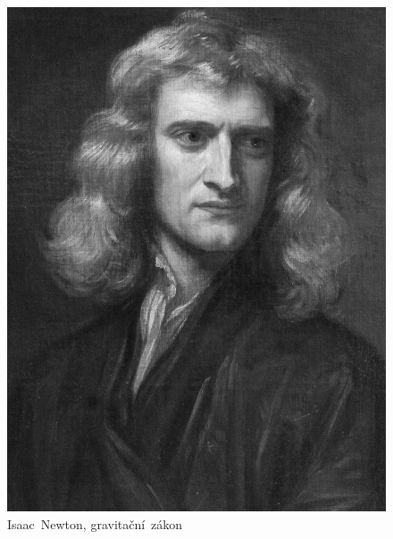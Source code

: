 \documentclass{../../../../style/mkimain}
\begin{document}
\begin{figure}[H]
\begin{center}
    \includegraphics[width=0.8\linewidth]{images/isaac-newton.jpg}
        Isaac~Newton, gravitační~zákon\\\ \\
    \end{center}
  \endminipage
\end{figure}
\vspace{0.5cm}
\end{document}
